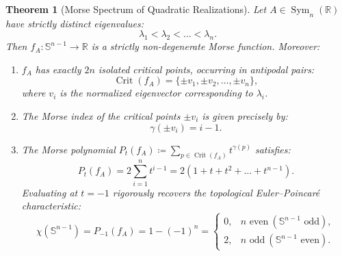 \documentclass[11pt,a4paper,reqno]{amsart}
\newtheorem{theorem}{Theorem}[section]
\theoremstyle{definition}
\numberwithin{equation}{section}
\newcommand{\R}{\mathbb{R}}
\newcommand{\Sph}{\mathbb{S}}
\begin{document}
\begin{theorem}[Morse Spectrum of Quadratic Realizations]
\label{thm:morse_matrix}
Let $A \in \operatorname{Sym}_n(\R)$ have strictly distinct eigenvalues:
\begin{equation}
    \lambda_1 < \lambda_2 < \dots < \lambda_n.
\end{equation}
Then $f_A \colon \Sph^{n-1} \to \R$ is a strictly non-degenerate Morse function. Moreover:
\begin{enumerate}[label=(\roman*)]
    \item $f_A$ has exactly $2n$ isolated critical points, occurring in antipodal pairs:
    \begin{equation}
        \operatorname{Crit}(f_A) = \{\pm v_1, \pm v_2, \dots, \pm v_n\},
    \end{equation}
    where $v_i$ is the normalized eigenvector corresponding to $\lambda_i$.
    \item The Morse index of the critical points $\pm v_i$ is given precisely by:
    \begin{equation}
        \gamma(\pm v_i) = i - 1.
    \end{equation}
    \item The Morse polynomial $P_t(f_A) \coloneqq \sum_{p \in \operatorname{Crit}(f_A)} t^{\gamma(p)}$ satisfies:
    \begin{equation}
        P_t(f_A) = 2 \sum_{i=1}^n t^{i-1} = 2 (1 + t + t^2 + \dots + t^{n-1}).
    \end{equation}
    Evaluating at $t = -1$ rigorously recovers the topological Euler--Poincar\'e characteristic:
    \begin{equation}
        \chi(\Sph^{n-1}) = P_{-1}(f_A) = 1 - (-1)^n = \begin{cases} 0, & n \text{ even} \ (\Sph^{n-1} \text{ odd}), \\ 2, & n \text{ odd} \ (\Sph^{n-1} \text{ even}). \end{cases}
    \end{equation}
\end{enumerate}
\end{theorem}
\end{document}
